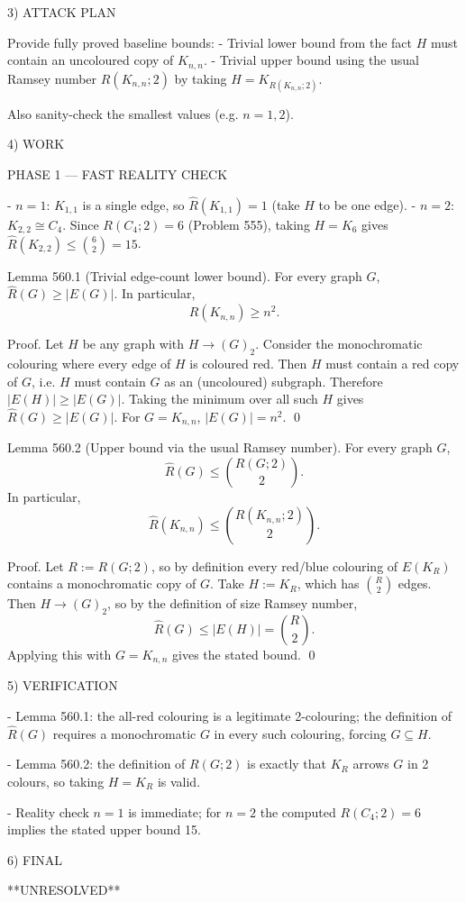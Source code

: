 3) ATTACK PLAN

Provide fully proved baseline bounds:
- Trivial lower bound from the fact $H$ must contain an uncoloured copy of $K_{n,n}$.
- Trivial upper bound using the usual Ramsey number $R(K_{n,n};2)$ by taking $H=K_{R(K_{n,n};2)}$.

Also sanity-check the smallest values (e.g. $n=1,2$).

4) WORK

PHASE 1 — FAST REALITY CHECK

- $n=1$: $K_{1,1}$ is a single edge, so $\hat R(K_{1,1})=1$ (take $H$ to be one edge).
- $n=2$: $K_{2,2}\cong C_4$. Since $R(C_4;2)=6$ (Problem 555), taking $H=K_6$ gives $\hat R(K_{2,2})\le \binom{6}{2}=15$.

Lemma 560.1 (Trivial edge-count lower bound).
For every graph $G$, $\hat R(G)\ge |E(G)|$.
In particular,
\[
\hat R(K_{n,n})\ge n^2.
\]

Proof.
Let $H$ be any graph with $H\to (G)_2$.
Consider the monochromatic colouring where every edge of $H$ is coloured red.
Then $H$ must contain a red copy of $G$, i.e. $H$ must contain $G$ as an (uncoloured) subgraph.
Therefore $|E(H)|\ge |E(G)|$.
Taking the minimum over all such $H$ gives $\hat R(G)\ge |E(G)|$.
For $G=K_{n,n}$, $|E(G)|=n^2$.
\qed

Lemma 560.2 (Upper bound via the usual Ramsey number).
For every graph $G$,
\[
\hat R(G)\le \binom{R(G;2)}{2}.
\]
In particular,
\[
\hat R(K_{n,n})\le \binom{R(K_{n,n};2)}{2}.
\]

Proof.
Let $R:=R(G;2)$, so by definition every red/blue colouring of $E(K_R)$ contains a monochromatic copy of $G$.
Take $H:=K_R$, which has $\binom{R}{2}$ edges.
Then $H\to (G)_2$, so by the definition of size Ramsey number,
\[
\hat R(G)\le |E(H)|=\binom{R}{2}.
\]
Applying this with $G=K_{n,n}$ gives the stated bound.
\qed

5) VERIFICATION

- Lemma 560.1: the all-red colouring is a legitimate 2-colouring; the definition of $\hat R(G)$ requires a monochromatic $G$ in every such colouring, forcing $G\subseteq H$.

- Lemma 560.2: the definition of $R(G;2)$ is exactly that $K_{R}$ arrows $G$ in 2 colours, so taking $H=K_R$ is valid.

- Reality check $n=1$ is immediate; for $n=2$ the computed $R(C_4;2)=6$ implies the stated upper bound 15.

6) FINAL

**UNRESOLVED**


